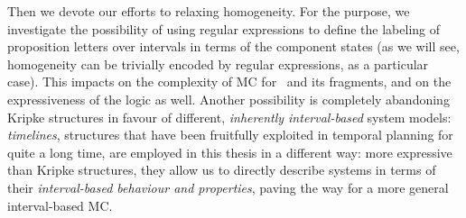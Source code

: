 Then we devote our efforts to 
relaxing homogeneity.
For the purpose, we investigate the possibility of using regular expressions to define the labeling of proposition letters over intervals in terms of the component states (as we will see, homogeneity can be trivially encoded by regular expressions, as a particular case). This impacts on the complexity of MC for \HS\ and its fragments, and on the expressiveness of the logic as well. 
Another possibility is completely abandoning Kripke structures in favour of different, \emph{inherently interval-based} system models: \emph{timelines}, structures that have been fruitfully exploited in temporal planning for quite a long time, are employed in this thesis in a different way: more expressive than Kripke structures, they 
allow us to directly describe systems in terms of their \emph{interval-based behaviour and properties},
paving the way for a more general interval-based MC.

